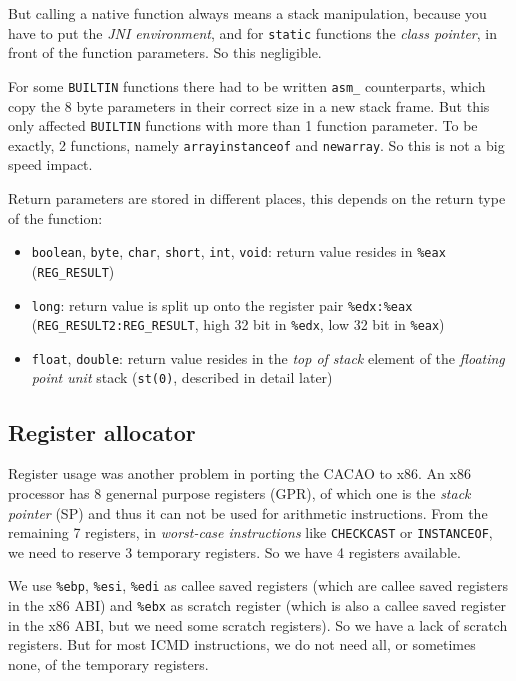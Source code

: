 But calling a native function always means a stack manipulation,
because you have to put the \textit{JNI environment}, and for
\texttt{static} functions the \textit{class pointer}, in front of the
function parameters. So this negligible.

For some \texttt{BUILTIN} functions there had to be written
\texttt{asm\_} counterparts, which copy the 8 byte parameters in their
correct size in a new stack frame. But this only affected
\texttt{BUILTIN} functions with more than 1 function parameter. To be
exactly, 2 functions, namely \texttt{arrayinstanceof} and
\texttt{newarray}. So this is not a big speed impact.

Return parameters are stored in different places, this depends on the
return type of the function:

\begin{itemize}
 \item \texttt{boolean}, \texttt{byte}, \texttt{char}, \texttt{short},
 \texttt{int}, \texttt{void}: return value resides in \texttt{\%eax}
 (\texttt{REG\_RESULT})

 \item \texttt{long}: return value is split up onto the register pair
 \texttt{\%edx:\%eax}
 (\texttt{REG\_RESULT2:REG\_RESULT}, high 32 bit in
 \texttt{\%edx}, low 32 bit in \texttt{\%eax})

 \item \texttt{float}, \texttt{double}: return value resides in the
 \textit{top of stack} element of the \textit{floating point unit}
 stack (\texttt{st(0)}, described in detail later)
\end{itemize}


\subsection{Register allocator}

Register usage was another problem in porting the CACAO to x86. An x86
processor has 8 genernal purpose registers (GPR), of which one is the
\textit{stack pointer} (SP) and thus it can not be used for arithmetic
instructions. From the remaining 7 registers, in \textit{worst-case
instructions} like \texttt{CHECKCAST} or \texttt{INSTANCEOF}, we need
to reserve 3 temporary registers. So we have 4 registers available.

We use \texttt{\%ebp}, \texttt{\%esi}, \texttt{\%edi} as callee saved
registers (which are callee saved registers in the x86 ABI) and
\texttt{\%ebx} as scratch register (which is also a callee saved
register in the x86 ABI, but we need some scratch registers). So we
have a lack of scratch registers. But for most ICMD instructions, we
do not need all, or sometimes none, of the temporary registers.

